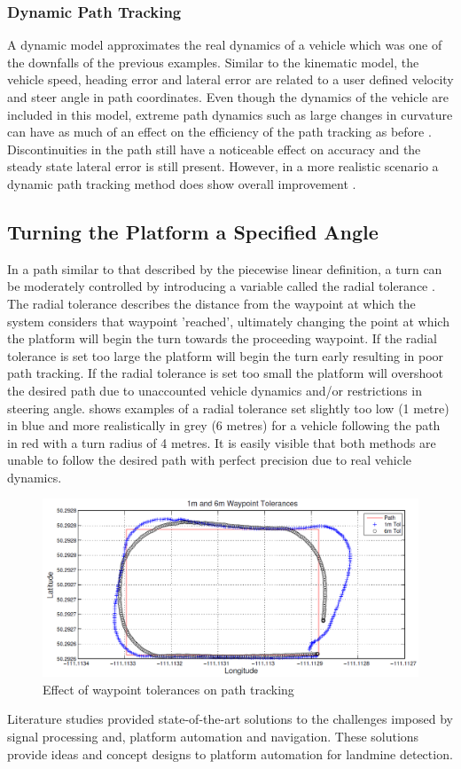 \documentclass[main.tex]{subfiles}
\begin{document}
\subsubsection{Dynamic Path Tracking}
A dynamic model approximates the real dynamics of a vehicle which was one of the downfalls of the previous examples. Similar to the kinematic model, the vehicle speed, heading error and lateral error are related to a user defined velocity and steer angle in path coordinates. Even though the dynamics of the vehicle are included in this model, extreme path dynamics such as large changes in curvature can have as much of an effect on the efficiency of the path tracking as before \parencite{snider2009}. Discontinuities in the path still have a noticeable effect on accuracy and the steady state lateral error is still present. However, in a more realistic scenario a dynamic path tracking method does show overall improvement \parencite{snider2009}.

\subsection{Turning the Platform a Specified Angle}
In a path similar to that described by the piecewise linear definition, a turn can be moderately controlled by introducing a variable called the radial tolerance \parencite{Giesbrecht2005}. The radial tolerance describes the distance from the waypoint at which the system considers that waypoint 'reached', ultimately changing the point at which the platform will begin the turn towards the proceeding waypoint. If the radial tolerance is set too large the platform will begin the turn early resulting in poor path tracking. If the radial tolerance is set too small the platform will overshoot the desired path due to unaccounted vehicle dynamics and/or restrictions in steering angle.  shows examples of a radial tolerance set slightly too low (1 metre) in blue and more realistically in grey (6 metres) for a vehicle following the path in red with a turn radius of 4 metres. It is easily visible that both methods are unable to follow the desired path with perfect precision due to real vehicle dynamics.
\begin{figure}[ht]
\includegraphics[width=\textwidth]{3-LiteratureReview/waypointTolerances.PNG}
\centering
\caption[Effect of waypoint tolerances on path tracking]{Effect of waypoint tolerances on path tracking \parencite{Giesbrecht2005}} 
\end{figure}

Literature studies provided  state-of-the-art solutions to the challenges imposed by signal processing and, platform automation and navigation. These solutions provide ideas and concept designs to platform automation for landmine detection.  
\end{document}
